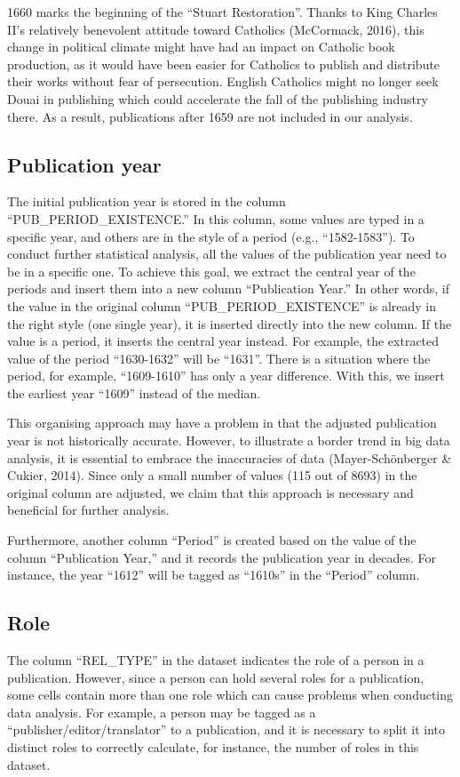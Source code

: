 \documentclass[12pt,a4paper,oneside]{book}
\begin{document}
\begin{sloppypar}
1660 marks the beginning of the “Stuart Restoration”. Thanks to King Charles II’s relatively benevolent attitude toward Catholics (McCormack, 2016), this change in political climate might have had an impact on Catholic book production, as it would have been easier for Catholics to publish and distribute their works without fear of persecution. English Catholics might no longer seek Douai in publishing which could accelerate the fall of the publishing industry there. As a result, publications after 1659 are not included in our analysis.

\subsection*{Publication year}
The initial publication year is stored in the column “PUB\_PERIOD\_EXISTENCE.” In this column, some values are typed in a specific year, and others are in the style of a period (e.g., “1582-1583”). To conduct further statistical analysis, all the values of the publication year need to be in a specific one. To achieve this goal, we extract the central year of the periods and insert them into a new column “Publication Year.” In other words, if the value in the original column “PUB\_PERIOD\_EXISTENCE” is already in the right style (one single year), it is inserted directly into the new column. If the value is a period, it inserts the central year instead. For example, the extracted value of the period “1630-1632” will be “1631”. There is a situation where the period, for example, “1609-1610” has only a year difference. With this, we insert the earliest year “1609” instead of the median.

This organising approach may have a problem in that the adjusted publication year is not historically accurate. However, to illustrate a border trend in big data analysis, it is essential to embrace the inaccuracies of data (Mayer-Schönberger \& Cukier, 2014). Since only a small number of values (115 out of 8693) in the original column are adjusted, we claim that this approach is necessary and beneficial for further analysis.

Furthermore, another column “Period” is created based on the value of the column “Publication Year,” and it records the publication year in decades. For instance, the year “1612” will be tagged as “1610s” in the “Period” column.

\subsection*{Role}
The column “REL\_TYPE” in the dataset indicates the role of a person in a publication. However, since a person can hold several roles for a publication, some cells contain more than one role which can cause problems when conducting data analysis. For example, a person may be tagged as a “publisher/editor/translator” to a publication, and it is necessary to split it into distinct roles to correctly calculate, for instance, the number of roles in this dataset.


\end{sloppypar}
\end{document}
